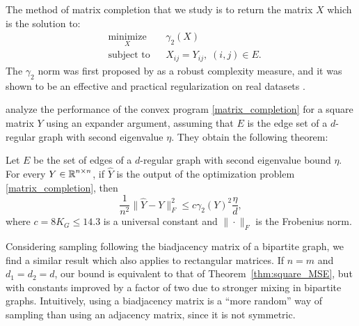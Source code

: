 The method of matrix completion that we study
is to return the matrix $X$ which is the solution to:
\begin{equation}
\label{matrix_completion}
\begin{aligned}
& \underset{X}{\text{minimize}}
& & \gamma_2(X) \\
& \text{subject to}
& & X_{ij} = Y_{ij}, \; (i,j) \in E .
\end{aligned}
\end{equation}
The $\gamma_2$ norm was first proposed by
\citet*{srebro2005,srebro2005a} 
as a robust complexity measure,
and it was shown to be an effective and practical regularization
on real datasets \citep*{lee2010a,recht2013}.

\citet*{heiman2014} analyze the performance
of the convex program \eqref{matrix_completion} 
for a square matrix $Y$
using an expander argument,
assuming that $E$ is the edge set of a $d$-regular graph 
with second eigenvalue $\eta$.
They obtain the following theorem:
\begin{theorem}
\label{thm:square_MSE}
Let $E$ be the set of edges of a $d$-regular graph with second eigenvalue bound $\eta$.
For every $Y \in \operatorname{\mathbb{R}}^{n \times n}$, if $\hat{Y}$ is the output of the optimization problem 
\eqref{matrix_completion}, then 
\[
	\frac{1}{n^2} \| \hat{Y} - Y \|_F^2 \leq c \gamma_2(Y)^2 \frac{\eta}{d},
\]
where $c = 8 K_G \leq 14.3$ is a universal constant and $\| \cdot \|_F$ is the Frobenius norm.
\end{theorem}

Considering sampling following the biadjacency matrix of a bipartite graph,
we find a similar result which also applies to rectangular matrices. 
If $n=m$ and $d_1 = d_2 = d$, our bound is equivalent to that of Theorem~\ref{thm:square_MSE},
but with constants improved by a factor of two due to stronger mixing in bipartite graphs.
Intuitively, using a biadjacency matrix is a ``more random'' way of sampling 
than using an adjacency matrix, since it is not symmetric.

